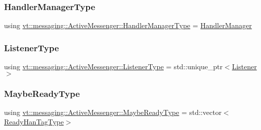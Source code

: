 \mbox{\label{structvt_1_1messaging_1_1_active_messenger_ac7e9165df6550ea333f8eb018a5a0e60}} 
\subsubsection{\texorpdfstring{Handler\+Manager\+Type}{HandlerManagerType}}
{\footnotesize\ttfamily using \hyperlink{structvt_1_1messaging_1_1_active_messenger_ac7e9165df6550ea333f8eb018a5a0e60}{vt\+::messaging\+::\+Active\+Messenger\+::\+Handler\+Manager\+Type} =  \hyperlink{structvt_1_1_handler_manager}{Handler\+Manager}}

\mbox{\label{structvt_1_1messaging_1_1_active_messenger_a63878fd4ef1fbc505bd1313d32049ca9}} 
\subsubsection{\texorpdfstring{Listener\+Type}{ListenerType}}
{\footnotesize\ttfamily using \hyperlink{structvt_1_1messaging_1_1_active_messenger_a63878fd4ef1fbc505bd1313d32049ca9}{vt\+::messaging\+::\+Active\+Messenger\+::\+Listener\+Type} =  std\+::unique\+\_\+ptr$<$\hyperlink{structvt_1_1messaging_1_1_listener}{Listener}$>$}

\mbox{\label{structvt_1_1messaging_1_1_active_messenger_a745d5e8cad8c2f67d20479afacc6e134}} 
\subsubsection{\texorpdfstring{Maybe\+Ready\+Type}{MaybeReadyType}}
{\footnotesize\ttfamily using \hyperlink{structvt_1_1messaging_1_1_active_messenger_a745d5e8cad8c2f67d20479afacc6e134}{vt\+::messaging\+::\+Active\+Messenger\+::\+Maybe\+Ready\+Type} =  std\+::vector$<$\hyperlink{structvt_1_1messaging_1_1_active_messenger_a98bb74aa4a561161dd7c7073dcd5f1d3}{Ready\+Han\+Tag\+Type}$>$}

